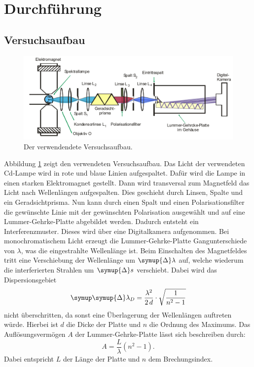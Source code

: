 \documentclass[
  bibliography=totoc,     %
  captions=tableheading,  %
  titlepage=firstiscover, %
]{scrartcl}
\begin{document}
\section{Durchführung}
\subsection{Versuchsaufbau}
\begin{figure}
  \centering
  \includegraphics[scale=0.39]{aufbau.png}
  \caption{Der verwendendete Versuchsaufbau.}
  \label{fig:3}
\end{figure}
\noindent
Abbildung \ref{fig:3} zeigt den verwendeten Versuchsaufbau. Das Licht der
verwendeten Cd-Lampe wird in rote und blaue Linien aufgespaltet. Dafür wird die
Lampe in einen starken Elektromagnet gestellt. Dann
wird transversal zum Magnetfeld das Licht nach Wellenlängen aufgespalten. Dies
geschieht durch Linsen, Spalte und ein Geradsichtprisma. Nun kann durch einen
Spalt und einen Polarisationsfilter die gewünschte Linie mit der gewünschten
Polarisation ausgewählt und auf eine Lummer-Gehrke-Platte abgebildet werden.
Dadurch entsteht ein Interferenzmuster. Dieses wird über eine Digitalkamera
aufgenommen. Bei monochromatischem Licht erzeugt die Lummer-Gehrke-Platte
Gangunterschiede von $\lambda$, was die eingestrahlte Wellenlänge ist. Beim
Einschalten des Magnetfeldes tritt eine Verschiebung der Wellenlänge um
$\symup{\Delta} \lambda$ auf, welche wiederum die interferierten Strahlen
um $\symup{\Delta} s$ verschiebt. Dabei wird das Dispersionsgebiet
\begin{equation}
    \symup \symup{\Delta} \lambda_D = \frac{\lambda^2}{2\, d} \cdot \sqrt{\frac{1}{n^2 - 1}}
    \label{eqn:11}
\end{equation}
nicht überschritten, da sonst eine Überlagerung der Wellenlängen auftreten würde.
Hierbei ist $d$ die Dicke der Platte und $n$ die Ordnung des Maximums. Das
Auflösungsvermögen $A$ der Lummer-Gehrke-Platte lässt sich beschreiben durch:
\begin{equation}
  A = \frac{L}{\lambda} (n^2 - 1).
  \label{eqn:12}
\end{equation}
Dabei entspricht $L$ der Länge der Platte und $n$ dem Brechungsindex.
\clearpage
\end{document}
